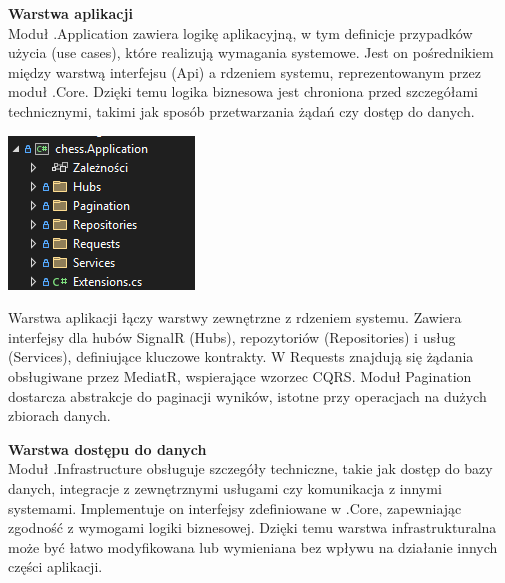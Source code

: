 \documentclass[12pt,a4paper]{article}
\begin{document}
\textbf{Warstwa aplikacji}\\
Moduł .Application zawiera logikę aplikacyjną, w tym definicje przypadków użycia (use cases), które realizują wymagania systemowe. Jest on pośrednikiem między warstwą interfejsu (Api) a rdzeniem systemu, reprezentowanym przez moduł .Core. Dzięki temu logika biznesowa jest chroniona przed szczegółami technicznymi, takimi jak sposób przetwarzania żądań czy dostęp do danych.

\vspace{0.5cm}
\begin{minipage}[t]{0.45\textwidth}
    \vspace{0pt}
    \centering
    \includegraphics[width=\linewidth]{zdj/struktura_back_application.png} 
\end{minipage}
\hfill
\begin{minipage}[t]{0.45\textwidth}
    \vspace{0pt}
    \raggedright
    Warstwa aplikacji łączy warstwy zewnętrzne z rdzeniem systemu. Zawiera interfejsy dla hubów SignalR (Hubs), repozytoriów (Repositories) i usług (Services), definiujące kluczowe kontrakty. W Requests znajdują się żądania obsługiwane przez MediatR, wspierające wzorzec CQRS. Moduł Pagination dostarcza abstrakcje do paginacji wyników, istotne przy operacjach na dużych zbiorach danych.
\end{minipage}
\vspace{0.5cm}

\textbf{Warstwa dostępu do danych}\\
Moduł .Infrastructure obsługuje szczegóły techniczne, takie jak dostęp do bazy danych, integracje z zewnętrznymi usługami czy komunikacja z innymi systemami. Implementuje on interfejsy zdefiniowane w .Core, zapewniając zgodność z wymogami logiki biznesowej. Dzięki temu warstwa infrastrukturalna może być łatwo modyfikowana lub wymieniana bez wpływu na działanie innych części aplikacji.
\end{document}
